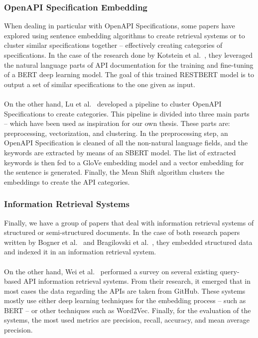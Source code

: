 \subsubsection{OpenAPI Specification Embedding}
When dealing in particular with OpenAPI Specifications, some papers have explored using sentence embedding algorithms to create retrieval systems or to cluster similar specifications together -- effectively creating categories of specifications.
In the case of the research done by Kotstein et al.~\cite{kotstein_restberta_2024}, they leveraged the natural language parts of API documentation for the training and fine-tuning of a BERT deep learning model.
The goal of this trained RESTBERT model is to output a set of similar specifications to the one given as input. \\ \\
On the other hand, Lu et al.~\cite{lu_comparing_2024} developed a pipeline to cluster OpenAPI Specifications to create categories.
This pipeline is divided into three main parts -- which have been used as inspiration for our own thesis.
These parts are: preprocessing, vectorization, and clustering.
In the preprocessing step, an OpenAPI Specification is cleaned of all the non-natural language fields, and the keywords are extracted by means of an SBERT model.
The list of extracted keywords is then fed to a GloVe embedding model and a vector embedding for the sentence is generated.
Finally, the Mean Shift algorithm clusters the embeddings to create the API categories.

\subsubsection{Information Retrieval Systems}
Finally, we have a group of papers that deal with information retrieval systems of structured or semi-structured documents.
In the case of both research papers written by Bogner et al.~\cite{bogner_evolvability_2020} and Bragilovski et al.~\cite{bragilovski_how_2024}, they embedded structured data and indexed it in an information retrieval system. \\ \\
On the other hand, Wei et al.~\cite{wei_survey_2023} performed a survey on several existing query-based API information retrieval systems.
From their research, it emerged that in most cases the data regarding the APIs are taken from GitHub.
These systems mostly use either deep learning techniques for the embedding process -- such as BERT -- or other techniques such as Word2Vec.
Finally, for the evaluation of the systems, the most used metrics are precision, recall, accuracy, and mean average precision.
